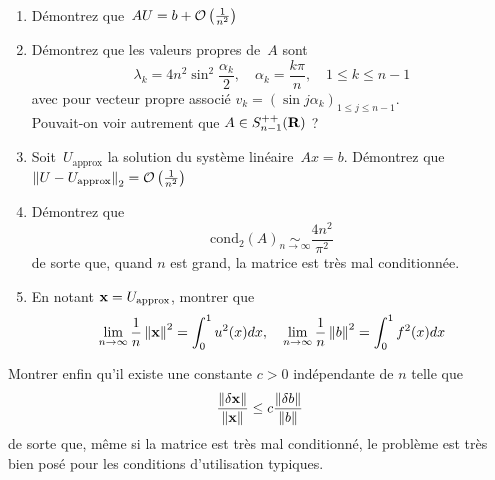 \begin{exercice}$ $
	\begin{enumerate}
		\item Démontrez que~$AU=b+\mathcal{O}\left(\frac1{n^2}\right)$
		\item Démontrez que les valeurs propres de~$A$ sont $$\lambda_k = 4n^2
			\sin^2 \frac{\alpha_k}{2}, \quad \alpha_k =  \frac{k \pi}{n}, \quad
			1\leq k \leq n-1$$ avec pour vecteur propre associé $v_k = (\sin j
			\alpha_k)_{1 \leq j \leq n-1}$.\\
			Pouvait-on voir autrement que $A \in S_{n-1}^{++}(\mathbf{R})$ ?
		\item Soit~$U_{\mathrm{approx}}$ la solution du système linéaire~$Ax=b$.
			Démontrez
			que $\left\|U-U_{\mathrm{approx}}\right\|_2=\mathcal{O}\left(\frac1{n^2}\right)$
\item Démontrez que
\begin{displaymath}
	\mathrm{cond}_2(A) \underset{n \rightarrow \infty}{\sim} \frac{4n^2}{\pi^2}
\end{displaymath}
de sorte que, quand $n$ est grand, la matrice est très mal conditionnée.
\item En notant $\mathbf{x} = U_{\mathrm{approx}}$, montrer que
\begin{displaymath}
\lim_{n \rightarrow \infty } \frac{1}{n} \left\|\mathbf{x}\right\|^2 = \int_0^1 u^2(x)dx,
\quad \lim_{n \rightarrow \infty } \frac{1}{n} \left\|b\right\|^2 = \int_0^1 f^2(x)dx
\end{displaymath}
	\end{enumerate}
\item Montrer enfin qu'il existe une constante $c > 0$ indépendante de $n$ telle que
\begin{displaymath}
\frac{\left\|\delta\mathbf{x}\right\|}{\left\|\mathbf{x}\right\|} \leq c \frac{\left\|\delta b\right\|}{\left\|b\right\|}
\end{displaymath}
de sorte que, même si la matrice est très mal conditionné, le problème est
très bien posé pour les conditions d'utilisation typiques.
\end{exercice}

